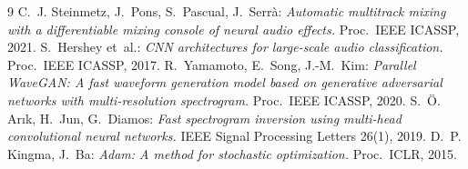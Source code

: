 \documentclass[11pt,a4paper]{article}
\begin{document}
\begin{thebibliography}{9}\small
{} C.~J. Steinmetz, J.~Pons, S.~Pascual, J.~Serrà:
  \emph{Automatic multitrack mixing with a differentiable mixing console of
  neural audio effects.} Proc.\ IEEE ICASSP, 2021.
 S.~Hershey et~al.: \emph{CNN architectures for
  large-scale audio classification.} Proc.\ IEEE ICASSP, 2017.
 R.~Yamamoto, E.~Song, J.-M.~Kim: \emph{Parallel
  WaveGAN: A fast waveform generation model based on generative adversarial
  networks with multi-resolution spectrogram.} Proc.\ IEEE ICASSP, 2020.
 S.~Ö. Arık, H.~Jun, G.~Diamos: \emph{Fast spectrogram
  inversion using multi-head convolutional neural networks.} IEEE Signal
  Processing Letters 26(1), 2019.
 D.~P. Kingma, J.~Ba: \emph{Adam: A method for stochastic
  optimization.} Proc.\ ICLR, 2015.
\end{thebibliography}
\end{document}
